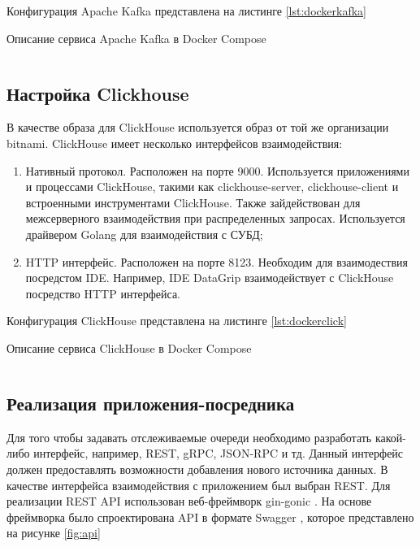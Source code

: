 \documentclass[14pt, russian]{scrartcl}
\begin{document}
Конфигурация Apache Kafka представлена на листинге \ref{lst:dockerkafka}

\begin{listing}[H]
	\caption{Описание сервиса Apache Kafka в Docker Compose}
	\label{lst:dockerkafka}
	\inputminted[style=bw, frame=single,fontsize = \footnotesize, linenos=false, xleftmargin = 1.5em]{yaml}{./listings/kafka.yml}
\end{listing}


\subsection{Настройка Clickhouse}

В качестве образа для ClickHouse используется образ от той же организации bitnami.
ClickHouse имеет несколько интерфейсов взаимодействия:
\begin{enumerate}
	\item Нативный протокол. Расположен на порте 9000. Используется приложениями и процессами ClickHouse, такими как clickhouse-server, clickhouse-client и встроенными инструментами ClickHouse. Также зайдействован для межсерверного взаимодействия при распределенных запросах.
	      Используется драйвером Golang для взаимодействия с СУБД;
	\item HTTP интерфейс. Расположен на порте 8123. Необходим для взаимодествия посредстом IDE. Например,
    IDE DataGrip \cite{Datagrip} взаимодействует с ClickHouse посредство HTTP интерфейса.
\end{enumerate}

Конфигурация ClickHouse представлена на листинге \ref{lst:dockerclick}

\begin{listing}[H]
	\caption{Описание сервиса ClickHouse в Docker Compose}
	\label{lst:dockerclick}
	\inputminted[style=bw, frame=single,fontsize = \footnotesize, linenos=false, xleftmargin = 1.5em]{yaml}{./listings/clickhouse.yml}
\end{listing}

\subsection{Реализация приложения-посредника}

Для того чтобы задавать отслеживаемые очереди необходимо
разработать какой-либо интерфейс, например, REST, gRPC, JSON-RPC и тд.
Данный интерфейс должен предоставлять возможности добавления нового
источника данных. В качестве интерфейса взаимодействия
с приложением был выбран REST. Для реализации REST API использован
веб-фреймворк gin-gonic \cite{GinGonic}. На основе фреймворка
было спроектирована API в формате Swagger \cite{Swagger}, которое представлено на
рисунке \ref{fig:api}
\end{document}
